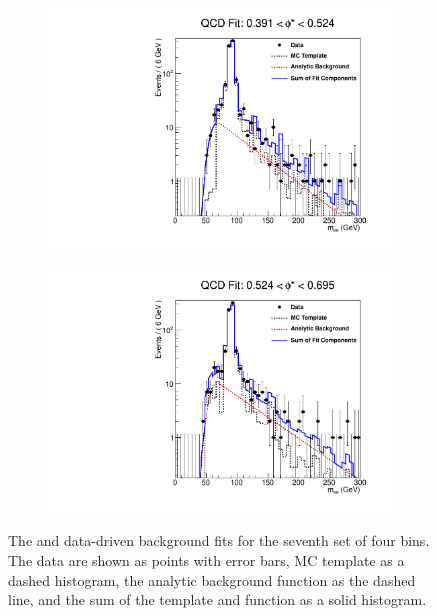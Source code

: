 \begin{figure}[!htbp]
\begin{subfigure}[b]{\SideBySidePlotWidth}
        \includegraphics[width=\linewidth]{figures/qcd_fits/qcd_fit_plot_for_27.pdf}
        \caption{}
        \label{fig:qcd_fit_27}
    \end{subfigure}%
    \begin{subfigure}[b]{\SideBySidePlotWidth}
        \includegraphics[width=\linewidth]{figures/qcd_fits/qcd_fit_plot_for_28.pdf}
        \caption{}
        \label{fig:qcd_fit_28}
    \end{subfigure}
    \caption[
       The \QCDjets and \wjets data-driven background fits for the seventh set
       of four \phistar bins.
    ]{
       The \QCDjets and \wjets data-driven background fits for the seventh set
       of four \phistar bins. The data are shown as points with error bars, MC
       template as a dashed histogram, the analytic background function as the
       dashed line, and the sum of the template and function as a solid
       histogram.
    }
    \label{fig:qcd_many_7}
\end{figure}

